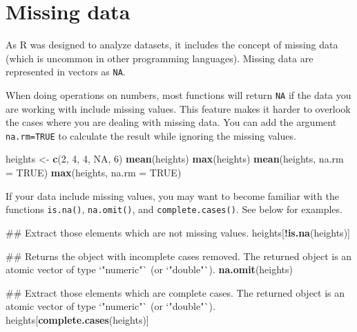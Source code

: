 \documentclass[]{book}
\newenvironment{Shaded}{\begin{snugshade}}{\end{snugshade}}
\newcommand{\KeywordTok}[1]{\textcolor[rgb]{0.13,0.29,0.53}{\textbf{#1}}}
\newcommand{\DataTypeTok}[1]{\textcolor[rgb]{0.13,0.29,0.53}{#1}}
\newcommand{\DecValTok}[1]{\textcolor[rgb]{0.00,0.00,0.81}{#1}}
\newcommand{\StringTok}[1]{\textcolor[rgb]{0.31,0.60,0.02}{#1}}
\newcommand{\OtherTok}[1]{\textcolor[rgb]{0.56,0.35,0.01}{#1}}
\newcommand{\OperatorTok}[1]{\textcolor[rgb]{0.81,0.36,0.00}{\textbf{#1}}}
\newcommand{\NormalTok}[1]{#1}
\begin{document}
\section{Missing data}\label{missing-data}

As R was designed to analyze datasets, it includes the concept of
missing data (which is uncommon in other programming languages). Missing
data are represented in vectors as \texttt{NA}.

When doing operations on numbers, most functions will return \texttt{NA}
if the data you are working with include missing values. This feature
makes it harder to overlook the cases where you are dealing with missing
data. You can add the argument \texttt{na.rm=TRUE} to calculate the
result while ignoring the missing values.

\begin{Shaded}
\begin{Highlighting}[]
\NormalTok{heights <-}\StringTok{ }\KeywordTok{c}\NormalTok{(}\DecValTok{2}\NormalTok{, }\DecValTok{4}\NormalTok{, }\DecValTok{4}\NormalTok{, }\OtherTok{NA}\NormalTok{, }\DecValTok{6}\NormalTok{)}
\KeywordTok{mean}\NormalTok{(heights)}
\KeywordTok{max}\NormalTok{(heights)}
\KeywordTok{mean}\NormalTok{(heights, }\DataTypeTok{na.rm =} \OtherTok{TRUE}\NormalTok{)}
\KeywordTok{max}\NormalTok{(heights, }\DataTypeTok{na.rm =} \OtherTok{TRUE}\NormalTok{)}
\end{Highlighting}
\end{Shaded}

If your data include missing values, you may want to become familiar
with the functions \texttt{is.na()}, \texttt{na.omit()}, and
\texttt{complete.cases()}. See below for examples.

\begin{Shaded}
\begin{Highlighting}[]
\NormalTok{## Extract those elements which are not missing values.}
\NormalTok{heights[}\OperatorTok{!}\KeywordTok{is.na}\NormalTok{(heights)]}

\NormalTok{## Returns the object with incomplete cases removed. The returned object is an atomic vector of type `"numeric"` (or `"double"`).}
\KeywordTok{na.omit}\NormalTok{(heights)}

\NormalTok{## Extract those elements which are complete cases. The returned object is an atomic vector of type `"numeric"` (or `"double"`).}
\NormalTok{heights[}\KeywordTok{complete.cases}\NormalTok{(heights)]}
\end{Highlighting}
\end{Shaded}
\end{document}
